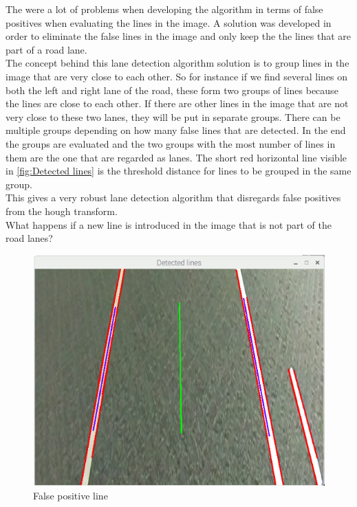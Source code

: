 The were a lot of problems when developing the algorithm in terms of false positives when evaluating the lines in the image. A solution was developed in order to eliminate the false lines in the image and only keep the the lines that are part of a road lane.\\

The concept behind this lane detection algorithm solution is to group lines in the image that are very close to each other. So for instance if we find several lines on both the left and right lane of the road, these form two groups of lines because the lines are close to each other. If there are other lines in the image that are not very close to these two lanes, they will be put in separate groups. There can be multiple groups depending on how many false lines that are detected. In the end the groups are evaluated and the two groups with the most number of lines in them are the one that are regarded as lanes. The short red horizontal line visible in \ref{fig:Detected lines} is the threshold distance for lines to be grouped in the same group.\\

This gives a very robust lane detection algorithm that disregards false positives from the hough transform.\\

What happens if a new line is introduced in the image that is not part of the road lanes?

\begin{figure}[H]
  \includegraphics[width=\textwidth]{./img/falsepositive.png}
  \centering
  \caption{False positive line}
  \label{fig:angle}
\end{figure}

